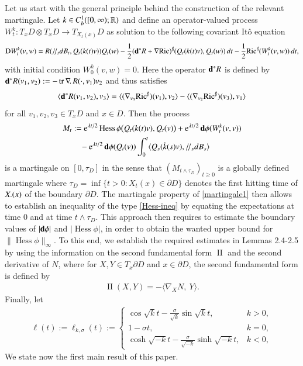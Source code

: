 \documentclass[11pt,reqno]{amsart}
\theoremstyle{definition} \newtheorem{remark}[theorem]{Remark}
\numberwithin{equation}{section}
\def\Ric{{\operatorname{Ric}}} \def\Hess{\operatorname{Hess}}
\def\tr{\operatorname{tr}}
\newcommand\1{\mathbbm{1}}
\def\Ric{{\operatorname{Ric}}} \def\Aut{{\operatorname{Aut}}}
\def\bd{{\bf d}}
\newcommand{\ptr}{/\!/}
\def\II{{\operatorname{II}}}
\begin{document}
 
Let us start with the general principle behind the construction of the relevant
martingale.  Let $k\in C_b^1([0,\infty);\mathbb{R})$  and define an
operator-valued process $W^k_t\colon T_xD\otimes T_xD\rightarrow T_{X_t(x)}D$ as
solution to the following covariant It\^{o} equation
\begin{align*}
 {\rm D} W_t^k(v, w)=R(\ptr_td  B_t, Q_t(k(t)v))Q_t(w)-\frac12(\bd^*R+\nabla \Ric)^{\sharp}(Q_t(k(t)v), Q_t(w))\,d  t-\frac12\Ric^{\sharp}(W_t^k(v, w))\,d  t,
\end{align*}
with initial condition $W_0^k(v,w)=0$. Here the operator $\bd ^*R$ is defined by
$\bd^*R(v_1,v_2):=-\tr\nabla{\!\bf.}\,R(\cdot, v_1)v_2$ and thus
satisfies
\begin{align*}
  \langle \bd^*R(v_1,v_2),v_3\rangle=\langle(\nabla_{v_3}\Ric^{\sharp})(v_1),v_2 \rangle-\langle (\nabla_{v_2}\Ric^{\sharp})(v_3),v_1 \rangle
\end{align*}
for all $v_1,v_2,v_3\in T_xD$ and $x\in D$.  Then the process
\begin{align}\label{martingale1}
M_t&:=\e^{\lambda t/2} \Hess \phi \big(Q_t(k(t)v), Q_t(v)\big)+\e^{\lambda t/2} \bd \phi
    (W_t^k(v, v)) \notag\\
  &\quad -\e^{\lambda t/2} \bd \phi(Q_t(v))\int_0^t\langle Q_s(\dot{k}(s)v),
    \ptr_sd  B_s \rangle
\end{align}
is a martingale on $[0,\tau_D]$ in the sense that $(M_{t\wedge\tau_D})_{t\geq0}$ is a globally defined martingale where $\tau_D=\inf\{t>0:X_t(x)\in\partial D\}$ denotes the first hitting time of
$X{\bf.}(x)$ of the boundary $\partial D$. The martingale property of \eqref{martingale1} then allows to establish
an inequality of the type \eqref{Hess-ineq} by equating the expectations at time 0 and at time
$t\wedge\tau_D$. This approach then requires to estimate the boundary values
of $|\bd \phi|$ and $|\Hess \phi|$, in order to obtain the wanted upper
bound for $\|\Hess \phi\|_{\infty}$. To this end, we establish the required 
estimates in Lemmas 2.4-2.5 by using the information on the second fundamental form $\II$ and the second derivative of  $N$, where for
$X, Y\in T_x\partial D$ and $x\in \partial D$, the second fundamental form is defined by
\begin{align*}
  \II(X,Y)=-\langle \nabla_X N, \ Y \rangle. 
\end{align*}
Finally, let
\begin{align}\label{fun-h}
\ell(t):=\ell_{k,\sigma}(t):=\left\{
      \begin{array}{ll}
        \cos{\sqrt{k}t}-\frac{\sigma}{\sqrt{k}}\sin {\sqrt{k}t}, & k> 0, \\
         1-\sigma t, & k= 0, \\
        \cosh{\sqrt{-k}t}-\frac{\sigma}{\sqrt{-k}}\sinh{\sqrt{-k}t}, & k<0,
      \end{array}
    \right.
\end{align}
We state now the first main result of this paper.
\end{document}

